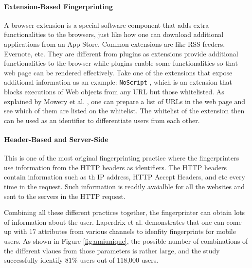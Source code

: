 \documentclass{acm_proc_article-sp}
\begin{document}
\paragraph{Extension-Based Fingerprinting}
A browser extension is a special software component that adds extra functionalities to the browsers, just like how one can download additional applications from an App Store. Common extensions are like RSS feeders, Evernote, etc. They are different from plugins as extensions provide additional functionalities to the browser while plugins enable some functionalities so that web page can be rendered effectively. Take one of the extensions that expose additional
information as an example: \verb|NoScript| \cite{noscript}, which is an extension that blocks executions of Web objects from any URL but those whitelisted. As explained by Mowery et al. \cite{mowery:fg}, one can prepare a list of URLs in the web page and see which of them are listed on the whitelist. The whitelist of the extension then can be used as an identifier to differentiate users from each other.

\paragraph{Header-Based and Server-Side}
This is one of the most original fingerprinting practice where the fingerprinters use information from the HTTP headers as identifiers. The HTTP headers contain information such as th IP address, HTTP Accept Headers, and etc every time in the request. Such information is readily avaialble for all the websites and sent to the servers in the HTTP request.

Combining all these different practices together, the fingerprinter can obtain lots of information about the user.  Laperdrix et al. \cite{pierre:beauty} demonstrates that one can come up with 17 attributes from various channels to idenfity fingerprints for mobile users. As shown in Figure \ref{fig:amiunique}, the possible number of combinations of the different vlaues from those parameters is rather large, and the study successfully identify $81\%$ users out of 118,000 users.
\end{document}
